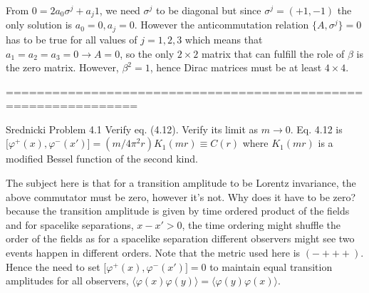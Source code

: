 \documentclass[aps,preprint,preprintnumbers,nofootinbib,showpacs,prd]{revtex4-1}
\begin{document}
From $0 = 2 a_0 \sigma^j + a_j 1$, we need $\sigma^j$ to be diagonal but since $\sigma^j = (+1, -1)$ the only solution is $a_0 = 0, a_j = 0$. However the anticommutation relation $\{A, \sigma^j\} = 0$ has to be true for all values of $j = 1,2,3$ which means that $a_1 = a_2 = a_3 = 0 \rightarrow A = 0$, so the only $2\times2$ matrix that can fulfill the role of $\beta$ is the zero matrix. However, $\beta^2 = 1$, hence Dirac matrices must be at least $4\times4$.

===============================================================

Srednicki Problem 4.1 Verify eq. (4.12). Verify its limit as $m \rightarrow 0$. Eq. 4.12 is $\lbrack \varphi^+(x),\varphi^-(x') \rbrack = (m/4\pi^2 r) K_1(mr) \equiv C(r)$ where $K_1(mr)$ is a modified Bessel function of the second kind.

The subject here is that for a transition amplitude to be Lorentz invariance, the above commutator must be zero, however it's not. Why does it have to be zero? because the transition amplitude is given by time ordered product of the fields and for spacelike separations, $x-x' > 0$, the time ordering might shuffle the order of the fields as for a spacelike separation different observers might see two events happen in different orders. Note that the metric used here is $(-+++)$. Hence the need to set $\lbrack \varphi^+(x),\varphi^-(x') \rbrack = 0$ to maintain equal transition amplitudes for all observers, $\langle \varphi(x) \varphi(y) \rangle = \langle \varphi(y) \varphi(x) \rangle$.
\end{document}
